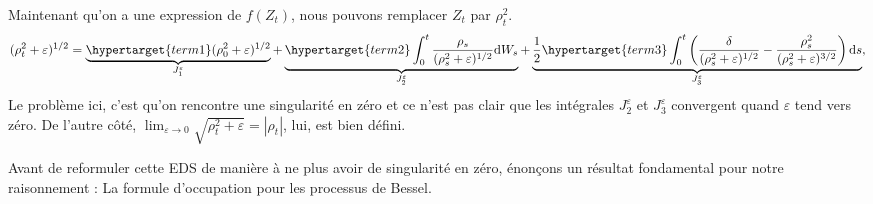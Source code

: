 \documentclass[openany]{book}
\newcommand{\1}{\mathbbm{1}}
\renewcommand{\d}{\mathrm{d}}
\theoremstyle{thmfont}
\theoremstyle{deffont}
\theoremstyle{thmfont}
\theoremstyle{deffont}
\begin{document}
Maintenant qu'on a une expression de $f(Z_t)$, nous pouvons remplacer $Z_t$ par $\rho_t^2$.
\begin{equation}
  (\rho_t^2 + \varepsilon)^{1/2} = \underbrace{\hypertarget{term1}(\rho_0^2 + \varepsilon)^{1/2}}_{J_1^\varepsilon}
  + \underbrace{\hypertarget{term2}\int_0^t  \dfrac{\rho_s}{(\rho_s^2 + \varepsilon)^{1/2}}\d W_s}_{J_2^\varepsilon}
  +  \underbrace{ \dfrac{1}{2} \hypertarget{term3} \int_0^t \left(\dfrac{\delta}{(\rho_s^2 + \varepsilon)^{1/2}} - \dfrac{\rho_s^2}{(\rho_s^2 + \varepsilon)^{3/2}}\right)\d s}_{J_3^\varepsilon},
  \label{eq:ApproxEDSBessel}
\end{equation}
Le problème ici, c'est qu'on rencontre une singularité en zéro et ce n'est pas clair que les intégrales \hyperlink{term2}{$J_2^\varepsilon$} et \hyperlink{term3}{$J_3^\varepsilon$} convergent quand $\varepsilon$ tend vers zéro. De l'autre côté, $\lim_{\varepsilon \to 0} \sqrt{\rho_t^2 + \varepsilon} = |\rho_t|$, lui, est bien défini.

Avant de reformuler cette EDS de manière à ne plus avoir de singularité en zéro, énonçons un résultat fondamental pour notre raisonnement : La formule d'occupation pour les processus de Bessel.

\end{document}
